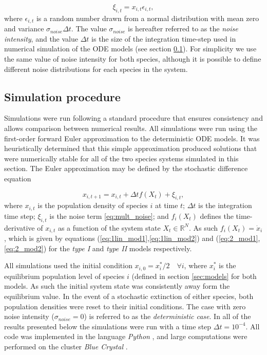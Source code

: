 \begin{equation}
\xi_{i,t} = x_{i,t} \epsilon_{i,t},
\label{eq:mult_noise}
\end{equation}
%
where $\epsilon_{i,t}$ is a random number drawn from a normal distribution with mean zero and variance $\sigma_{noise}\Delta t$. The value $\sigma_{noise}$ is hereafter referred to as the \emph{noise intensity}, and the value $\Delta t$ is the size of the integration time-step used in numerical simulation of the ODE models (see section \ref{sec:simulation_method}). For simplicity we use the same value of noise intensity for both species, although it is possible to define different noise distributions for each species in the system.

\subsection{Simulation procedure}
\label{sec:simulation_method}

Simulations were run following a standard procedure that ensures consistency and allows comparison between numerical results. All simulations were run using the first-order forward Euler approximation to the deterministic ODE models. It was heuristically determined that this simple approximation produced solutions that were numerically stable for all of the two species systems simulated in this section. The Euler approximation may be defined by the stochastic difference equation

\begin{equation}
\label{eq:stochastic_diff}
x_{i, t+1} = x_{i, t} + \Delta t f(X_t) + \xi_{i,t},
\end{equation}
%
where $x_{i,t}$ is the population density of species $i$ at time $t$; $\Delta t$ is the integration time step; $\xi_{i,t}$ is the noise term \eqref{eq:mult_noise}; and $f_i(X_t)$ defines the time-derivative of $x_{i,t}$ as a function of the system state $X_t \in \mathbb{R}^N$. As such $f_i(X_t) = \dot{x}_i$, which is given by equations (\ref{eq:1lin_mod1},\ref{eq:1lin_mod2}) and (\ref{eq:2_mod1},\ref{eq:2_mod2}) for the \emph{type I} and \emph{type II} models respectively.

All simulations used the initial condition $x_{i,0} = x_i^*/2 \quad \forall i$, where $x_i^*$ is the equilibrium population level of species $i$ (defined in section \ref{sec:models} for both models. As such the initial system state was consistently away form the equilibrium value. In the event of a stochastic extinction of either species, both population densities were reset to their initial conditions. The case with zero noise intensity ($\sigma_{noise} = 0$) is referred to as the \emph{deterministic case}. In all of the results presented below the simulations were run with a time step $\Delta t = 10^{-4}$. All code was implemented in the language \emph{Python} \cite{python}, and large computations were performed on the cluster \emph{Blue Crystal} \cite{BC3}.

